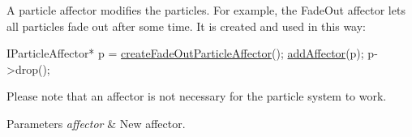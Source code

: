 A particle affector modifies the particles. For example, the Fade\+Out affector lets all particles fade out after some time. It is created and used in this way\+: 
\begin{DoxyCode}
IParticleAffector* p = \hyperlink{classirr_1_1scene_1_1IParticleSystemSceneNode_a4a9c3ecdf6118267f312f9389bb24888}{createFadeOutParticleAffector}();
\hyperlink{classirr_1_1scene_1_1IParticleSystemSceneNode_a401f5afbbb748878011c5ceb7d447f8b}{addAffector}(p);
p->drop();
\end{DoxyCode}
 Please note that an affector is not necessary for the particle system to work. 
\begin{DoxyParams}{Parameters}
{\em affector} & New affector. \\
\hline
\end{DoxyParams}
\mbox{\label{classirr_1_1scene_1_1IParticleSystemSceneNode_a1459245186d570f81f6c7ff78ddd38db}} 
